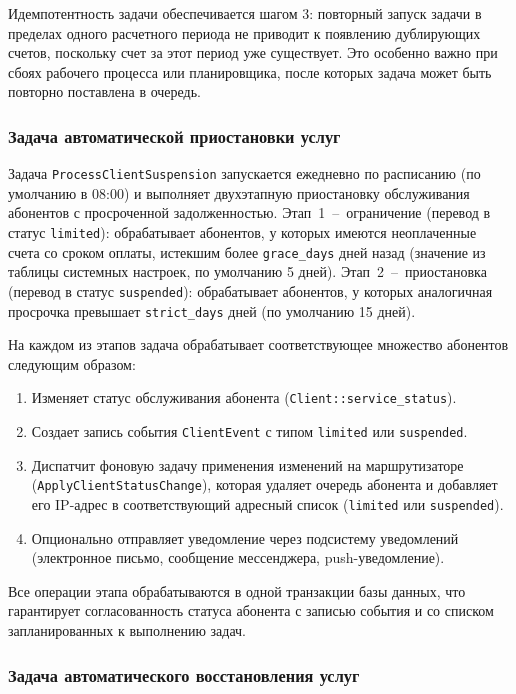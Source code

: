 Идемпотентность задачи обеспечивается шагом 3: повторный запуск задачи в пределах одного расчетного периода не приводит к появлению дублирующих счетов, поскольку счет за этот период уже существует. Это особенно важно при сбоях рабочего процесса или планировщика, после которых задача может быть повторно поставлена в очередь.

\subsubsection{Задача автоматической приостановки услуг}

Задача \texttt{ProcessClientSuspension} запускается ежедневно по расписанию (по умолчанию в 08:00) и выполняет двухэтапную приостановку обслуживания абонентов с просроченной задолженностью. Этап~1~--~ограничение (перевод в статус \texttt{limited}): обрабатывает абонентов, у которых имеются неоплаченные счета со сроком оплаты, истекшим более \texttt{grace\_days} дней назад (значение из таблицы системных настроек, по умолчанию 5 дней). Этап~2~--~приостановка (перевод в статус \texttt{suspended}): обрабатывает абонентов, у которых аналогичная просрочка превышает \texttt{strict\_days} дней (по умолчанию 15 дней).

На каждом из этапов задача обрабатывает соответствующее множество абонентов следующим образом:
\begin{enumerate}
\item Изменяет статус обслуживания абонента (\texttt{Client::service\_status}).
\item Создает запись события \texttt{ClientEvent} с типом \texttt{limited} или \texttt{suspended}.
\item Диспатчит фоновую задачу применения изменений на маршрутизаторе (\texttt{ApplyClientStatusChange}), которая удаляет очередь абонента и добавляет его IP-адрес в соответствующий адресный список (\texttt{limited} или \texttt{suspended}).
\item Опционально отправляет уведомление через подсистему уведомлений (электронное письмо, сообщение мессенджера, push-уведомление).
\end{enumerate}

Все операции этапа обрабатываются в одной транзакции базы данных, что гарантирует согласованность статуса абонента с записью события и со списком запланированных к выполнению задач.

\subsubsection{Задача автоматического восстановления услуг}

